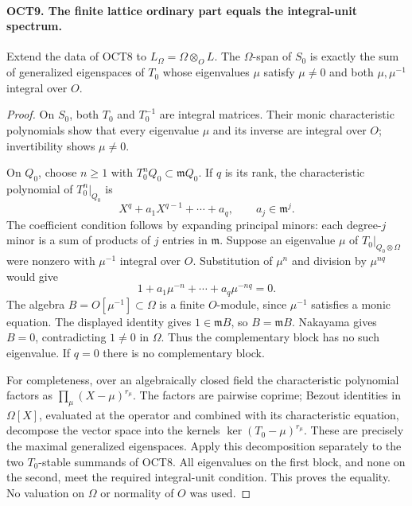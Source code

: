 \paragraph{OCT9. The finite lattice ordinary part equals the integral-unit spectrum.}
\label{claim:OCT9}
Extend the data of OCT8 to $L_\Omega=\Omega\otimes_O L$.
The $\Omega$-span of $S_0$ is exactly the sum of generalized
eigenspaces of $T_0$ whose eigenvalues $\mu$ satisfy
$\mu\ne0$ and both $\mu,\mu^{-1}$ integral over $O$.
\begin{proof}
On $S_0$, both $T_0$ and $T_0^{-1}$ are integral matrices.
Their monic characteristic polynomials show that every
eigenvalue $\mu$ and its inverse are integral over $O$;
invertibility shows $\mu\ne0$.

On $Q_0$, choose $n\geq1$ with
$T_0^nQ_0\subset\mathfrak m Q_0$.  If $q$ is its rank,
the characteristic polynomial of $T_0^n|_{Q_0}$ is
\[
             X^q+a_1X^{q-1}+\cdots+a_q,
                              \qquad a_j\in\mathfrak m^j.
\]
The coefficient condition follows by expanding principal
minors: each degree-$j$ minor is a sum of products of $j$
entries in $\mathfrak m$.  Suppose an eigenvalue $\mu$ of
$T_0|_{Q_0\otimes\Omega}$ were nonzero with $\mu^{-1}$
integral over $O$.  Substitution of $\mu^n$ and division by
$\mu^{nq}$ would give
\[
              1+a_1\mu^{-n}+\cdots+a_q\mu^{-nq}=0.
\]
The algebra $B=O[\mu^{-1}]\subset\Omega$ is a finite
$O$-module, since $\mu^{-1}$ satisfies a monic equation.
The displayed identity gives $1\in\mathfrak m B$, so
$B=\mathfrak m B$.  Nakayama gives $B=0$, contradicting
$1\ne0$ in $\Omega$.  Thus the complementary block has no
such eigenvalue.  If $q=0$ there is no complementary block.

For completeness, over an algebraically closed field the
characteristic polynomial factors as
$\prod_\mu(X-\mu)^{r_\mu}$.  The factors are pairwise
coprime; Bezout identities in $\Omega[X]$, evaluated at the
operator and combined with its characteristic equation,
decompose the vector space into the kernels
$\ker(T_0-\mu)^{r_\mu}$.  These are precisely the maximal
generalized eigenspaces.  Apply this decomposition separately
to the two $T_0$-stable summands of OCT8.  All eigenvalues on
the first block, and none on the second, meet the required
integral-unit condition.  This proves the equality.  No
valuation on $\Omega$ or normality of $O$ was used.
\end{proof}

